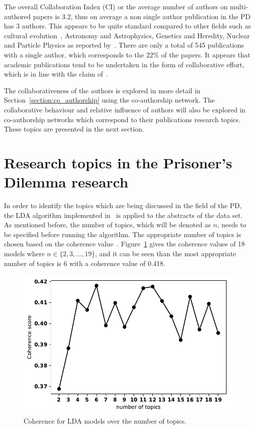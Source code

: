 \documentclass{article}
\theoremstyle{definition}
\begin{document}
The overall Collaboration Index (CI) or the average number of authors on
multi-authored papers is 3.2, thus on average a non single author publication in
the PD has 3 authors. This appears to be quite standard compared to other fields
such as cultural evolution~\cite{youngblood2018}, Astronomy and Astrophysics,
Genetics and Heredity, Nuclear and Particle Physics as reported
by~\cite{nature_author_blog}.
There are only a total of 545 publications with a single author, which
corresponds to the 22\% of the papers. It appears that academic publications
tend to be undertaken in the form of collaborative effort, which is in line
with the claim of~\cite{Kyvik2017}.

The collaborativeness of the authors is explored in more detail in
Section~\ref{section:co_authorship} using the co-authorship network. The
collaborative behaviour and relative influence of authors will also be explored
in co-authorship networks which correspond to their publications research topics.
These topics are presented in the next section.

\section{Research topics in the Prisoner's Dilemma research}\label{section:topics}

In order to identify the topics which are being discussed in the field of the
PD, the LDA algorithm implemented in~\cite{rehurek_lrec} is applied to the
abstracts of the data set. As mentioned before, the number of topics, which
will be denoted as \(n\), needs to be specified before running the algorithm.
The appropriate number of topics is chosen based on the coherence
value~\cite{Roder2015}. Figure~\ref{fig:coherence_value_over_number_of_topcis}
gives the coherence values of 18 models where \(n \in \{2, 3, \dots, 19\}\), and
it can be seen than the most appropriate number of topics is 6 with a coherence
value of 0.418.

\begin{figure}[!hbtp]
    \centering
    \includegraphics[width=.45\textwidth]{./assets/images/coherence_values.pdf}
    \caption{Coherence for LDA models over the number of topics.}
    \label{fig:coherence_value_over_number_of_topcis}
\end{figure}
\end{document}
